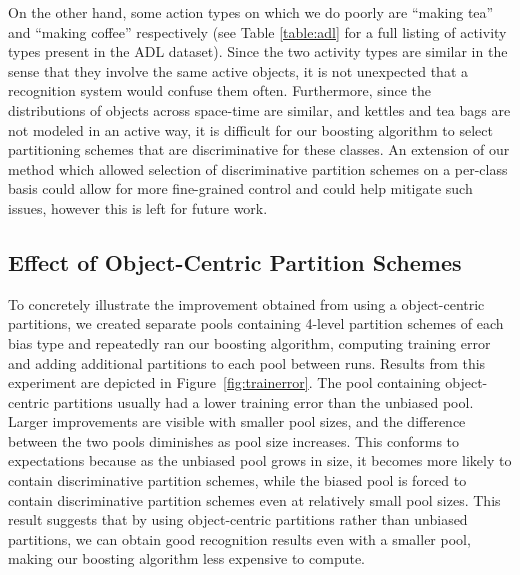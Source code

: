 \documentclass[12pt]{article} %
\begin{document}
  On the other hand, some action types on which we do
  poorly are ``making tea'' and ``making coffee''
  respectively (see Table \ref{table:adl} for a full listing of activity types present in
  the ADL dataset). Since the two activity types are similar in the sense that
  they involve the same active objects, it is not
  unexpected that a recognition system would confuse them often.
  Furthermore, since the distributions of objects across space-time are
  similar, and kettles and tea bags are not modeled in an active way, it is
  difficult for our boosting algorithm to select partitioning schemes that
  are discriminative for these classes. An extension of our method which
  allowed selection of discriminative partition schemes on a per-class basis
  could allow for more fine-grained control and could help mitigate such
  issues, however this is left for future work.




  

  \subsection{Effect of Object-Centric Partition Schemes}
  To concretely illustrate the improvement obtained from using a
  object-centric partitions, we created separate pools containing 4-level
  partition schemes of each bias type and
  repeatedly ran our boosting algorithm, computing training error and adding additional
  partitions to each pool between runs. Results from this experiment are
  depicted in Figure~\ref{fig:trainerror}. The pool containing object-centric partitions 
  usually had a lower training error than the unbiased pool.
  Larger improvements are visible with smaller pool sizes, and the difference
  between the two pools diminishes as pool size increases. This conforms to
  expectations because as the unbiased pool grows in size, it becomes more
  likely to contain discriminative partition schemes, while the biased pool
  is forced to contain discriminative partition schemes even at relatively
  small pool sizes. This result suggests that by using object-centric
  partitions rather than unbiased partitions, we can obtain good recognition
  results even with a smaller pool, making our boosting algorithm less expensive
  to compute.
 
\end{document}
